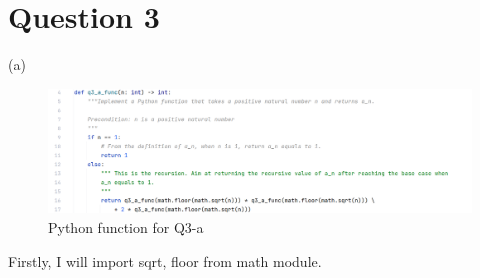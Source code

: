 \documentclass[12pt]{article}
\newcommand{\mysection}[2]{\setcounter{section}{#1}\addtocounter{section}{-1}\section{Question #1}}
\begin{document}

    







\mysection{3}{Question 3}
(a)
\begin{figure}[h]
    \centering
    \includegraphics[width = 1.0\textwidth]{../tex_pic/q3_a.png}
    \caption{Python function for Q3-a}
\end{figure}

\noindent Firstly, I will import sqrt, floor from math module.
\end{document}
